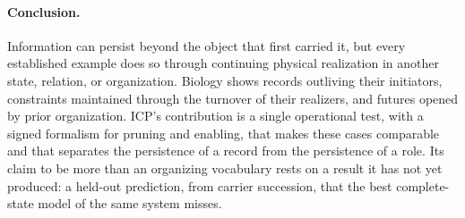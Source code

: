 \paragraph{Conclusion.} Information can persist beyond the object that first
carried it, but every established example does so through continuing physical
realization in another state, relation, or organization. Biology shows records
outliving their initiators, constraints maintained through the turnover of
their realizers, and futures opened by prior organization. ICP's contribution
is a single operational test, with a signed formalism for pruning and enabling,
that makes these cases comparable and that separates the persistence of a
record from the persistence of a role. Its claim to be more than an organizing
vocabulary rests on a result it has not yet produced: a held-out prediction,
from carrier succession, that the best complete-state model of the same system
misses.
